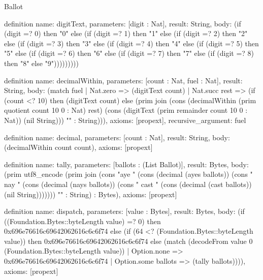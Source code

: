 \begin{lexlean}{Ballot}
\begin{semanticmodule}
definition{
  name: digitText,
  parameters: [digit : Nat],
  result: String,
  body: (if (digit =? 0) then "0" else (if (digit =? 1) then "1" else (if (digit =? 2) then "2" else (if (digit =? 3) then "3" else (if (digit =? 4) then "4" else (if (digit =? 5) then "5" else (if (digit =? 6) then "6" else (if (digit =? 7) then "7" else (if (digit =? 8) then "8" else "9")))))))))
}

definition{
  name: decimalWithin,
  parameters: [count : Nat, fuel : Nat],
  result: String,
  body: (match fuel
    | Nat.zero => (digitText count)
    | Nat.succ rest => (if (count <? 10) then (digitText count) else (prim join (cons (decimalWithin (prim quotient count 10 0 : Nat) rest) (cons (digitText (prim remainder count 10 0 : Nat)) (nil String))) "" : String))),
  axioms: [propext],
  recursive_argument: fuel
}

definition{
  name: decimal,
  parameters: [count : Nat],
  result: String,
  body: (decimalWithin count count),
  axioms: [propext]
}

definition{
  name: tally,
  parameters: [ballots : (List Ballot)],
  result: Bytes,
  body: (prim utf8_encode (prim join (cons "aye " (cons (decimal (ayes ballots)) (cons " nay " (cons (decimal (nays ballots)) (cons " cast " (cons (decimal (cast ballots)) (nil String))))))) "" : String) : Bytes),
  axioms: [propext]
}

definition{
  name: dispatch,
  parameters: [value : Bytes],
  result: Bytes,
  body: (if ((Foundation.Bytes::byteLength value) =? 0) then 0x696e76616c69642062616c6c6f74 else (if (64 <? (Foundation.Bytes::byteLength value)) then 0x696e76616c69642062616c6c6f74 else (match (decodeFrom value 0 (Foundation.Bytes::byteLength value))
    | Option.none => 0x696e76616c69642062616c6c6f74
    | Option.some ballots => (tally ballots)))),
  axioms: [propext]
}


\end{semanticmodule}
\end{lexlean}

